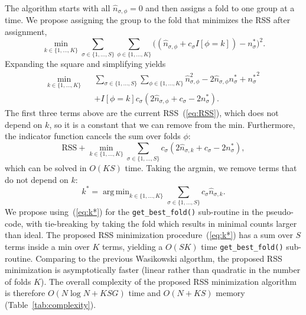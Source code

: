 \documentclass[twoside]{article}
\DeclareMathOperator*{\argmin}{arg\, min}
\begin{document}
The algorithm starts with all $\hat n_{\sigma,\phi}=0$ and then assigns a fold to one group at a time.
We propose assigning the group to the fold that minimizes the RSS after assignment,
\begin{equation}
\min_{k\in\{1,\dots,K\}}
\sum_{\sigma\in\{1,\dots,S\}}
\sum_{\phi\in\{1,\dots,K\}}
\big(
(\hat n_{\sigma,\phi}+c_\sigma I[\phi=k]) - n^*_\sigma\big)^2.
\end{equation}
Expanding the square and simplifying yields
\begin{eqnarray}
  \min_{k\in\{1,\dots,K\}}
  &&
     \sum_{\sigma\in\{1,\dots,S\}}
     \sum_{\phi\in\{1,\dots,K\}}
     \hat n^2_{\sigma,\phi}
     - 2 \hat n_{\sigma,\phi} n^*_\sigma+ {n^*_\sigma}^2
     \nonumber\\
  &&
+ I[\phi=k] c_\sigma ( 2 \hat n_{\sigma,\phi} + c_\sigma - 2n^*_\sigma ).
\end{eqnarray}
The first three terms above are the current RSS~(\ref{eq:RSS}), which does not depend on $k$, so it is a constant that we can remove from the min.
Furthermore, the indicator function cancels the sum over folds $\phi$:
\begin{equation}
\text{RSS} + \min_{k\in\{1,\dots,K\}}
\sum_{\sigma\in\{1,\dots,S\}}
c_\sigma ( 2 \hat n_{\sigma,k} + c_\sigma - 2n^*_\sigma ),
\end{equation}
which can be solved in $O(KS)$ time.
Taking the argmin, we remove terms that do not depend on $k$:
\begin{equation}
  \label{eq:k*}
k^* = 
\argmin_{k\in\{1,\dots,K\}}
\sum_{\sigma\in\{1,\dots,S\}}
c_\sigma \hat n_{\sigma,k}.
\end{equation}
We propose using~(\ref{eq:k*}) for the \texttt{get\_best\_fold()} sub-routine in the pseudo-code, with tie-breaking by taking the fold which results in minimal counts larger than ideal.
The proposed RSS minimization procedure~(\ref{eq:k*}) has a sum over $S$ terms inside a min over $K$ terms, yielding a  $O(SK)$ time  \texttt{get\_best\_fold()} sub-routine.
Comparing to the previous Wasikowski algorthm, the proposed RSS minimization is asymptotically faster (linear rather than quadratic in the number of folds $K$).
The overall complexity of the proposed RSS minimization algorithm is therefore $O(N\log N+KSG)$ time and $O(N+KS)$ memory (Table~\ref{tab:complexity}).
\end{document}
